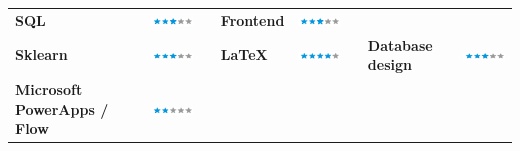 \documentclass[]{friggeri-cv}
\begin{document}
\begin{table}[!h]
\begin{tabular}{L{3.25cm}cL{2cm}L{2.25cm}cL{2cm}L{2.25cm}c}
		\textbf{SQL} & \includegraphics[scale=0.4]{img/3stars.png}
		&&
		\textbf{Frontend} & \includegraphics[scale=0.40]{img/3stars.png} \\
		\textbf{Sklearn}&
		\includegraphics[scale=0.40]{img/3stars.png} &&
		\textbf{\LaTeX} & \includegraphics[scale=0.4]{img/4stars.png}
		&&
		\textbf{Database design}&
		\includegraphics[scale=0.40]{img/3stars.png}\\
		\textbf{Microsoft PowerApps / Flow}&
		\includegraphics[scale=0.40]{img/2stars.png}&&
		&
		&&
		&
	\end{tabular}
\end{table}
\end{document}
